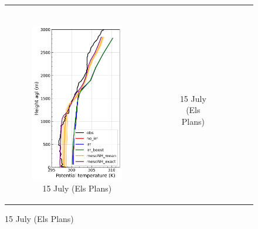 \begin{figure}[hbtp]
{\begin{tabular}{@{}cccc@{}}
\begin{subfigure}[t]{0.283\textwidth}
        \end{subfigure} \\
        \begin{subfigure}[t]{0.382\textwidth}
            \caption{15 July (Els Plans)}
            \includegraphics[width=\textwidth]{images/chap5/profiles/profile_elsplans_theta_1507_.png}
        \end{subfigure} &
        \begin{subfigure}[t]{0.289\textwidth}
            \caption{15 July (Els Plans)}

\end{subfigure}
\end{tabular}}
\end{figure}
